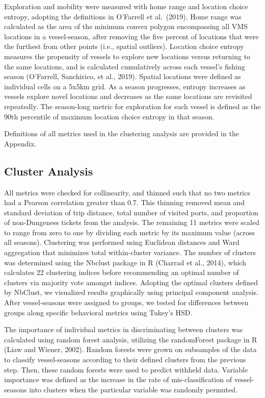 \documentclass[]{elsarticle} %
\begin{document}
Exploration and mobility were measured with home range and location
choice entropy, adopting the definitions in O'Farrell et al.~(2019).
Home range was calculated as the area of the minimum convex polygon
encompassing all VMS locations in a vessel-season, after removing the
five percent of locations that were the furthest from other points
(i.e., spatial outliers). Location choice entropy measures the
propensity of vessels to explore new locations versus returning to the
same locations, and is calculated cumulatively across each vessel's
fishing season (O'Farrell, Sanchirico, et al., 2019). Spatial locations
were defined as individual cells on a 5x5km grid. As a season
progresses, entropy increases as vessels explore novel locations and
decreases as the same locations are revisited repeatedly. The
season-long metric for exploration for each vessel is defined as the
90th percentile of maximum location choice entropy in that season.

Definitions of all metrics used in the clustering analysis are provided
in the Appendix.

\hypertarget{cluster-analysis}{%
\subsection{Cluster Analysis}\label{cluster-analysis}}

All metrics were checked for collinearity, and thinned such that no two
metrics had a Pearson correlation greater than 0.7. This thinning
removed mean and standard deviation of trip distance, total number of
visited ports, and proportion of non-Dungeness tickets from the
analysis. The remaining 11 metrics were scaled to range from zero to one
by dividing each metric by its maximum value (across all seasons).
Clustering was performed using Euclidean distances and Ward aggregation
that minimizes total within-cluster variance. The number of clusters was
determined using the Nbclust package in R (Charrad et al., 2014), which
calculates 22 clustering indices before recommending an optimal number
of clusters via majority vote amongst indices. Adopting the optimal
clusters defined by NbClust, we visualized results graphically using
principal component analysis. After vessel-seasons were assigned to
groups, we tested for differences between groups along specific
behavioral metrics using Tukey's HSD.

The importance of individual metrics in discriminating between clusters
was calculated using random forest analysis, utilizing the randomForest
package in R (Liaw and Wiener, 2002). Random forests were grown on
subsamples of the data to classify vessel-seasons according to their
defined clusters from the previous step. Then, these random forests were
used to predict withheld data. Variable importance was defined as the
increase in the rate of mis-classification of vessel-seasons into
clusters when the particular variable was randomly permuted.
\end{document}
